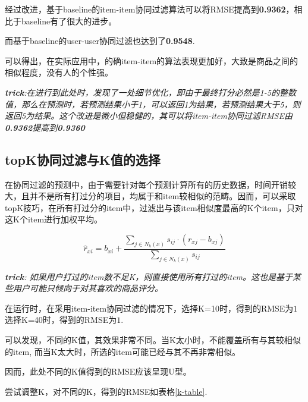\documentclass[utf8, a4paper,12pt, onecolumn]{ctexart}
\begin{document}
\begin{spacing}{1.3}
经过改进，基于baseline的item-item协同过滤算法可以将RMSE提高到\textbf{0.9362}，相比于baseline有了很大的进步。

而基于baseline的user-user协同过滤也达到了\textbf{0.9548}.

可以得出，在实际应用中，的确item-item的算法表现更加好，大致是商品之间的相似程度，没有人的个性强。

\textit{\textbf{trick}:在进行到此处时，发现了一处细节优化，即由于最终打分必然是1-5的整数值，那么在预测时，若预测结果小于1，可以返回1为结果，若预测结果大于5，则返回5为结果。这个改进是微小但稳健的，其可以将item-item协同过滤RMSE由\textbf{0.9362}提高到\textbf{0.9360}}

\subsection{topK协同过滤与K值的选择}

在协同过滤的预测中，由于需要针对每个预测计算所有的历史数据，时间开销较大，且并不是所有打过分的项目，均属于和item较相似的范畴。因而，可以采取topK技巧，在所有打过分的item中，过滤出与该item相似度最高的K个item，只对这K个item进行加权平均。

\[\hat{r}_{xi} = b_{xi}  + \frac{\sum_{j \in N_k(x)} s_{ij} \cdot (r_{xj} - b_{xj})}{\sum_{j \in N_k(x)} s_{ij}} \]

\textit{\textbf{trick}: 如果用户打过的item数不足K，则直接使用所有打过的item。这也是基于某些用户可能只倾向于对其喜欢的商品评分。}

在运行时，在采用item-item协同过滤的情况下，选择K=10时，得到的RMSE为$1$选择K=40时，得到的RMSE为$1$.

可以发现，不同的K值，其效果非常不同。当K太小时，不能覆盖所有与其较相似的item, 而当K太大时，所选的item可能已经与其不再非常相似。

因而，此处不同的K值得到的RMSE应该呈现U型。

尝试调整K，对不同的K，得到的RMSE如表格\ref{k-table}.


\end{spacing}
\end{document}

